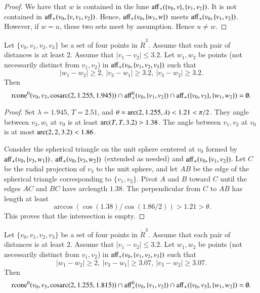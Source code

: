 \begin{proof} 
We have that $w$ is contained in the lune ${\operatorname{aff}}_+(\{v_0,v\},\{v_1,v_2\})$.
It is not contained in ${\operatorname{aff}}_+(v_0,\{v,v_1,v_2\})$.  Hence,
${\operatorname{aff}}_+(v_0,\{w_1,w\})$ meets ${\operatorname{aff}}_+(v_0,\{v_1,v_2\})$.  However,
if $w=u$, these two sets meet by assumption.  Hence $u\ne w$.
\end{proof}

\begin{lemma}
Let $\{v_0,v_1,v_2,v_3\}$ be a set of four points in $\ring{R}^3$.
Assume that each pair of distances is at least $2$.
Assume that $|v_1-v_2|\le 3.2$.  Let $w_1,w_2$ be points (not necessarily
distinct from $v_1,v_2$)
in ${\operatorname{aff}}_+(v_0,\{v_1,v_2,v_3\})$ such that
  $$|w_1-w_2|\ge 2,\ |v_3-w_1|\ge 3.2,\ |v_3-w_2|\ge 3.2.
  $$
Then 
  $${\operatorname{rcone}}^0(v_0,v_3,\operatorname{cosarc}(2,1.255,1.945)) \cap {\operatorname{aff}}_+^0(v_0,\{v_1,v_2\})
  \cap {\operatorname{aff}}_+(\{v_0,v_3\},\{w_1,w_2\})
=\emptyset.$$
\end{lemma}


\begin{proof}
Set $\lambda=1.945$, $T=2.51$, and
    $\theta = \operatorname{arc}(2,1.255,\lambda)< 1.21 <\pi/2$.  
They angle between $v_3,w_i$ at $v_0$ is at least
$\operatorname{arc}(T,T,3.2)>1.38$. The angle between
$v_1,v_2$ at $v_0$ is at most
$\operatorname{arc}(2,2,3.2)<1.86$.

Consider the spherical triangle on the unit sphere centered at $v_0$
formed by
 ${\operatorname{aff}}_+(v_0,\{v_3,w_1\})$, ${\operatorname{aff}}_+(v_0,\{v_3,w_2\})$ 
(extended as needed) and ${\operatorname{aff}}_+(v_0,\{v_1,v_2\})$. 
Let $C$ be the radial projection of
$v_3$ to the unit sphere, 
and let $AB$ be the edge of the spherical triangle corresponding to
$\{v_1,v_2\}$. Pivot $A$ and $B$ toward $C$ until the edges $AC$ and
$BC$ have arclength $1.38$.  The perpendicular from $C$ to $AB$
has length at least
    $$\arccos(\cos(1.38)/\cos(1.86/2))>1.21>\theta.$$
This proves that the intersection is empty.
\end{proof}

\newpage
\begin{lemma}
Let $\{v_0,v_1,v_2,v_3\}$ be a set of four points in $\ring{R}^3$.
Assume that each pair of distances is at least $2$.
Assume that $|v_1-v_2|\le 3.2$.  Let $w_1,w_2$ be points (not necessarily
distinct from $v_1,v_2$)
in ${\operatorname{aff}}_+(v_0,\{v_1,v_2,v_3\})$ such that
  $$|w_1-w_2|\ge 2,\ |v_3-w_1|\ge 3.07,\ |v_3-w_2|\ge 3.07.
  $$
Then 
  $${\operatorname{rcone}}^0(v_0,v_3,\operatorname{cosarc}(2,1.255,1.815)) \cap {\operatorname{aff}}_+^0(v_0,\{v_1,v_2\})
  \cap {\operatorname{aff}}_+(\{v_0,v_3\},\{w_1,w_2\})
=\emptyset.$$
\end{lemma}

